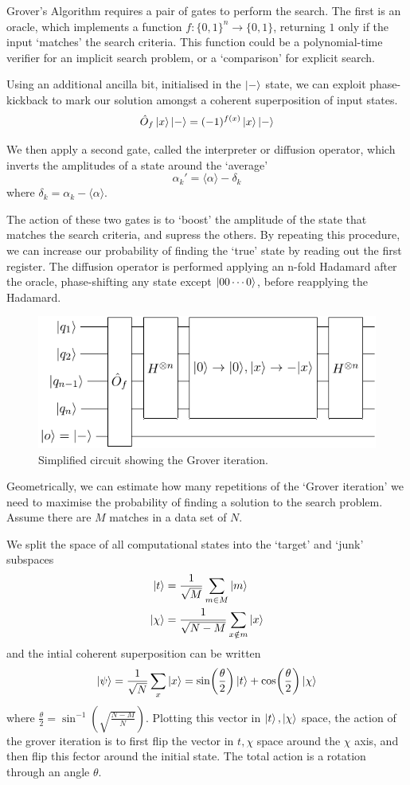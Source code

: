 \documentclass[11pt]{article}
\begin{document}
Grover's Algorithm requires a pair of gates to perform the search. The first is an oracle, which implements a function $f:\{0,1\}^{n}\rightarrow\{0,1\}$, returning $1$ only if the input `matches' the search criteria. This function could be a polynomial-time verifier for an implicit search problem, or a `comparison' for explicit search.

Using an additional ancilla bit, initialised in the $\ket{-}$ state, we can exploit phase-kickback to mark our solution amongst a coherent superposition of input states.
\begin{equation}
    \hat{O}_{f}\ket{x}\ket{-} = (-1)^{f(x)}\ket{x}\ket{-}
\end{equation}

We then apply a second gate, called the interpreter or diffusion operator, which inverts the amplitudes of a state around the `average'
\[\alpha_{k}' = \langle\alpha\rangle - \delta_{k}\]
where $\delta_{k} = \alpha_{k}-\langle\alpha\rangle$.

The action of these two gates is to `boost' the amplitude of the state that matches the search criteria, and supress the others. By repeating this procedure, we can increase our probability of finding the `true' state by reading out the first register. The diffusion operator is performed applying an n-fold Hadamard after the oracle, phase-shifting any state except $\ket{00\cdots 0}$, before reapplying the Hadamard.

\begin{figure}[h]
    \centering
    \includegraphics[width=.5\textwidth]{Circuits/grover.pdf}
    \caption{Simplified circuit showing the Grover iteration.}
\end{figure}

Geometrically, we can estimate how many repetitions of the `Grover iteration' we need to maximise the probability of finding a solution to the search problem. Assume there are $M$ matches in a data set of $N$.

We split the space of all computational states into the `target' and `junk' subspaces
\begin{align*}
    \ket{t} &= \frac{1}{\sqrt{M}}\sum_{m\in M}\ket{m} \\
    \ket{\chi} &= \frac{1}{\sqrt{N-M}}\sum_{x\notin m}\ket{x}
\end{align*}
and the intial coherent superposition can be written
\begin{equation}
    \ket{\psi}=\frac{1}{\sqrt{N}}\sum_{x}\ket{x} = \sin(\frac{\theta}{2})\ket{t}+\cos(\frac{\theta}{2})\ket{\chi}
\end{equation}
where $\frac{\theta}{2}=\sin^{-1}(\sqrt{\frac{N-M}{N}})$. Plotting this vector in $\ket{t},\ket{\chi}$ space, the action of the grover iteration is to first flip the vector in $t,\chi$ space around the $\chi$ axis, and then flip this fector around the initial state. The total action is a rotation through an angle $\theta$.
\end{document}
